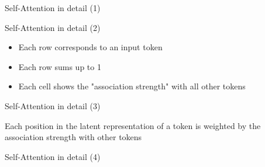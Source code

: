 \documentclass[12pt,aspectratio=169,handout]{beamer}
\begin{document}
\begin{frame}{Self-Attention in detail (1)}
	
	
	\begin{figure}
		\scalebox{0.75}{\hspace{-2cm}
			
		}
	\end{figure}
	
\end{frame}

\begin{frame}{Self-Attention in detail (2)}
	
	
	\begin{figure}
		\scalebox{0.75}{\hspace{-2cm}
			
		}
	\end{figure}
	
	\begin{itemize}
		\item 	Each row corresponds to an input token
		
		\item Each row sums up to 1
		
		\item Each cell shows the "association strength" with all other tokens
		
	\end{itemize}
	
	
\end{frame}



\begin{frame}{Self-Attention in detail (3)}
	
	
	\begin{figure}
		\scalebox{0.75}{\hspace{-2cm}
			
		}
	\end{figure}
	
	
	Each position in the latent representation of a token is weighted by the association strength with other tokens
	
	
\end{frame}


\begin{frame}{Self-Attention in detail (4)}
	
	
	\begin{figure}
		\scalebox{0.75}{\hspace{-2cm}
			
		}
	\end{figure}
	
\end{frame}
\end{document}
